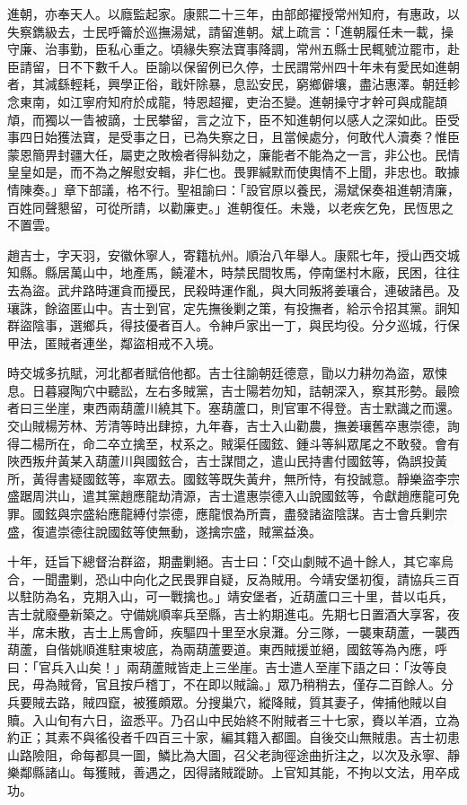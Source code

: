 \begin{pinyinscope}
進朝，亦奉天人。以廕監起家。康熙二十三年，由部郎擢授常州知府，有惠政，以失察鐫級去，士民呼籥於巡撫湯斌，請留進朝。斌上疏言：「進朝履任未一載，操守廉、治事勤，臣私心重之。頃緣失察法寶事降調，常州五縣士民輒號泣罷市，赴臣請留，日不下數千人。臣諭以保留例已久停，士民謂常州四十年未有愛民如進朝者，其減繇輕耗，興學正俗，戢奸除暴，息訟安民，窮鄉僻壤，盡沾惠澤。朝廷軫念東南，如江寧府知府於成龍，特恩超擢，吏治丕變。進朝操守才幹可與成龍頡頏，而獨以一眚被謫，士民攀留，言之泣下，臣不知進朝何以感人之深如此。臣受事四日始獲法寶，是受事之日，已為失察之日，且當候處分，何敢代人瀆奏？惟臣蒙恩簡畀封疆大任，屬吏之敗檢者得糾劾之，廉能者不能為之一言，非公也。民情皇皇如是，而不為之解慰安輯，非仁也。畏罪緘默而使輿情不上聞，非忠也。敢據情陳奏。」章下部議，格不行。聖祖諭曰：「設官原以養民，湯斌保奏祖進朝清廉，百姓同聲懇留，可從所請，以勸廉吏。」進朝復任。未幾，以老疾乞免，民恆思之不置雲。

趙吉士，字天羽，安徽休寧人，寄籍杭州。順治八年舉人。康熙七年，授山西交城知縣。縣居萬山中，地產馬，饒灌木，時禁民間牧馬，停南堡村木廠，民困，往往去為盜。武弁路時運貪而擾民，民殺時運作亂，與大同叛將姜瓖合，連破諸邑。及瓖誅，餘盜匿山中。吉士到官，定先撫後剿之策，有投撫者，給示令招其黨。詗知群盜陰事，選鄉兵，得技優者百人。令紳戶家出一丁，與民均役。分夕巡城，行保甲法，匿賊者連坐，鄰盜相戒不入境。

時交城多抗賦，河北都者賦倍他都。吉士往諭朝廷德意，勖以力耕勿為盜，眾悚息。日暮寢陶穴中聽訟，左右多賊黨，吉士陽若勿知，詰朝深入，察其形勢。最險者曰三坐崖，東西兩葫蘆川繞其下。塞葫蘆口，則官軍不得登。吉士默識之而還。交山賊楊芳林、芳清等時出肆掠，九年春，吉士入山勸農，撫姜瓖舊卒惠崇德，詢得二楊所在，命二卒立擒至，杖系之。賊渠任國鉉、鍾斗等糾眾尾之不敢發。會有陜西叛弁黃某入葫蘆川與國鉉合，吉士謀間之，遣山民持書付國鉉等，偽誤投黃所，黃得書疑國鉉等，率眾去。國鉉等既失黃弁，無所恃，有投誠意。靜樂盜李宗盛踞周洪山，遣其黨趙應龍劫清源，吉士遣惠崇德入山說國鉉等，令獻趙應龍可免罪。國鉉與宗盛紿應龍縛付崇德，應龍恨為所賣，盡發諸盜陰謀。吉士會兵剿宗盛，復遣崇德往說國鉉等使無動，遂擒宗盛，賊黨益渙。

十年，廷旨下總督治群盜，期盡剿絕。吉士曰：「交山劇賊不過十餘人，其它率烏合，一聞盡剿，恐山中向化之民畏罪自疑，反為賊用。今靖安堡初復，請協兵三百以駐防為名，克期入山，可一戰擒也。」靖安堡者，近葫蘆口三十里，昔以屯兵，吉士就廢壘新築之。守備姚順率兵至縣，吉士約期進屯。先期七日置酒大享客，夜半，席未散，吉士上馬會師，疾驅四十里至水泉灘。分三隊，一襲東葫蘆，一襲西葫蘆，自偕姚順進駐東坡底，為兩葫蘆要道。東西賊援並絕，國鉉等為內應，呼曰：「官兵入山矣！」兩葫蘆賊皆走上三坐崖。吉士遣人至崖下語之曰：「汝等良民，毋為賊脅，官且按戶稽丁，不在即以賊論。」眾乃稍稍去，僅存二百餘人。分兵要賊去路，賊四竄，被獲頗眾。分搜巢穴，縱降賊，質其妻子，俾捕他賊以自贖。入山旬有六日，盜悉平。乃召山中民始終不附賊者三十七家，賚以羊酒，立為約正；其素不與徭役者千四百三十家，編其籍入都圖。自後交山無賊患。吉士初患山路險阻，命每都具一圖，鱗比為大圖，召父老詢徑途曲折注之，以次及永寧、靜樂鄰縣諸山。每獲賊，善遇之，因得諸賊蹤跡。上官知其能，不拘以文法，用卒成功。


\end{pinyinscope}
